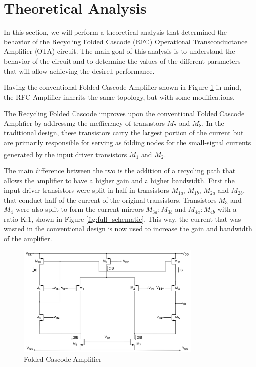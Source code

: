 \section{Theoretical Analysis}
\label{sec:TheoreticalAnalysys}
In this section, we will perform a theoretical analysis that determined the behavior of the Recycling Folded Cascode (RFC) Operational Transconductance Amplifier (OTA) circuit. The main goal of this analysis is to understand the behavior of the circuit and to determine the values of the different parameters that will allow achieving the desired performance.

Having the conventional Folded Cascode Amplifier shown in Figure \ref{fig:FC} in mind, the RFC Amplifier inherits the same topology, but with some modifications. 

The Recycling Folded Cascode improves upon the conventional Folded Cascode Amplifier by addressing the inefficiency of transistors $M_{7}$ and $M_{8}$. In the traditional design, these transistors carry the largest portion of the current but are primarily responsible for serving as folding nodes for the small-signal currents generated by the input driver transistors $M_{1}$ and $M_{2}$\textsuperscript{\cite{artigo-prof}}.

The main difference between the two is the addition of a recycling path that allows the amplifier to have a higher gain and a higher bandwidth. First the input driver transistors were split in half in transistors $M_{1a}$, $M_{1b}$, $M_{2a}$ and $M_{2b}$, that conduct half of the current of the original transistors. Transistors $M_{3}$ and $M_{4}$ were also split to form the current mirrors $M_{3a}:M_{3b}$ and $M_{4a}:M_{4b}$ with a ratio K:1, shown in Figure \ref{fig:full_schematic}. This way, the current that was wasted in the conventional design is now used to increase the gain and bandwidth of the amplifier.

\begin{figure}[H]
    \centering
    \includegraphics[width=0.8\textwidth]{Images/FC.png}
    \caption{Folded Cascode Amplifier}
    \label{fig:FC}  
\end{figure}

